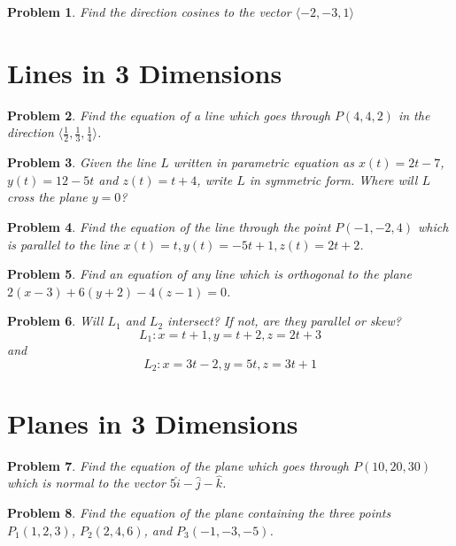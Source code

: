 \documentclass[11pt]{article}
\newtheorem{problem}{Problem}
\begin{document}
\begin{problem}
Find the direction cosines to the vector $\langle -2,-3,1\rangle$
\end{problem}


\section{Lines in 3 Dimensions}

\begin{problem}
Find the equation of a line which goes through $P(4,4,2)$ in the direction $\langle \frac{1}{2}, \frac{1}{3}, \frac{1}{4} \rangle$.
\end{problem}
\begin{problem}
Given the line $L$ written in parametric equation as $x(t) = 2t-7$, $y(t) = 12-5t$ and $z(t) = t+4$, write $L$ in symmetric form. Where will $L$ cross the plane $y=0$?
\end{problem}

\begin{problem}
Find the equation of the line through the point $P(-1,-2,4)$ which is parallel to the line $x(t) = t, y(t) = -5t+1, z(t) = 2t+2$.  
\end{problem}

\begin{problem}
    Find an equation of any line which is orthogonal to the plane $2(x-3)+6(y+2)-4(z-1) = 0$.
\end{problem}

\begin{problem}
    Will $L_1$ and $L_2$ intersect? If not, are they parallel or skew? \[L_1: x= t+1, y = t+2, z= 2t+3\] and \[L_2: x = 3t-2, y= 5t, z = 3t+1\]
\end{problem}

\section{Planes in 3 Dimensions}

\begin{problem}
    Find the equation of the plane which goes through $P(10,20,30)$ which is normal to the vector $5\hat{i}-\hat{j}-\hat{k}$.
\end{problem}

\begin{problem}
    Find the equation of the plane containing the three points $P_1(1,2,3)$, $P_2(2,4,6)$, and $P_3(-1,-3,-5)$.
\end{problem}
\end{document}
